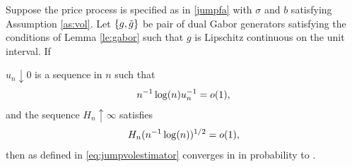 \begin{prop}\label{pro:finite}
  Suppose the  price process is specified as in \eqref{jumpfa} with $\sigma$ and $b$ satisfying Assumption \ref{as:vol}. Let $\{g, \tilde{g}\}$ be pair of dual Gabor generators satisfying the conditions of Lemma \eqref{le:gabor} such that $g$ is Lipschitz continuous on the unit interval. If 
  \begin{comment}
  \begin{enumerate}[label=\emph{(}\roman*\emph{)}]
    \item 
  the drift of $X$ satisfies with probability 1:
  \begin{align}
    \limsup_{\Delta_n \to 0} \frac{M^*}{(\Delta_n \log(1/\Delta_n))^{1/2}} \le  C< \infty, \notag
    \label{}
  \end{align}
where $M^* : = \sup_{1 \le i <n} \vert \int^{t_{i+1}}_{t_i} b(s) \D s\vert$;
\item the diffusion coefficient satisfies with probability 1:  $\int^1_0 \sigma^2(s) \D s < \infty$ and 
  \begin{align}
\limsup_{\Delta_n \to 0} \frac{S^*}{\Delta_n} \le B <\infty, \notag
    \label{}
  \end{align}
  where $S^* := \sup_{1 \le i <n} \vert \int^{t_{i+1}}_{t_i} \sigma^2(s) \D s\vert$;
  \end{enumerate}
  \end{comment}
 $u_n \downarrow 0 $ is a sequence in $n$ such that  
\begin{align}
    n^{-1} \log (n)u_n^{-1} = o(1),\notag
    \label{}
  \end{align}
and the sequence $H_n \uparrow \infty$ satisfies 
  \begin{align}
    H_n (n^{-1} \log(n))^{1/2} = o(1),\notag
    \label{}
  \end{align}
  then
  \jvn as defined in \eqref{eq:jumpvolestimator}  converges in \Ltwo in probability to \sv.
\end{prop}
